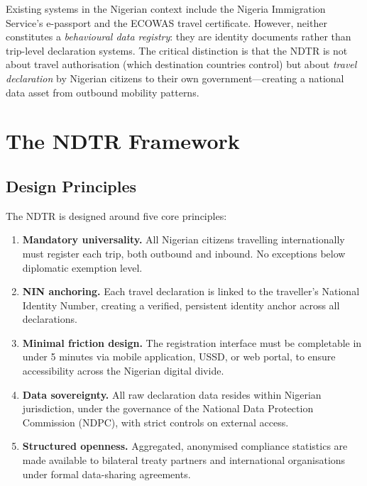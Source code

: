 \documentclass[11pt]{article}
\begin{document}
Existing systems in the Nigerian context include the Nigeria Immigration
Service's e-passport and the ECOWAS travel certificate. However, neither
constitutes a \textit{behavioural data registry}: they are identity
documents rather than trip-level declaration systems. The critical
distinction is that the NDTR is not about travel authorisation
(which destination countries control) but about \textit{travel declaration}
by Nigerian citizens to their own government---creating a national data
asset from outbound mobility patterns.

\section{The NDTR Framework}
\label{sec:framework}

\subsection{Design Principles}

The NDTR is designed around five core principles:

\begin{enumerate}[label=\textbf{P\arabic*.}, leftmargin=*]
  \item \textbf{Mandatory universality.} All Nigerian citizens travelling
  internationally must register each trip, both outbound and inbound.
  No exceptions below diplomatic exemption level.

  \item \textbf{NIN anchoring.} Each travel declaration is linked to the
  traveller's National Identity Number, creating a verified, persistent
  identity anchor across all declarations.

  \item \textbf{Minimal friction design.} The registration interface must
  be completable in under 5 minutes via mobile application, USSD, or
  web portal, to ensure accessibility across the Nigerian digital divide.

  \item \textbf{Data sovereignty.} All raw declaration data resides within
  Nigerian jurisdiction, under the governance of the National Data
  Protection Commission (NDPC), with strict controls on external access.

  \item \textbf{Structured openness.} Aggregated, anonymised compliance
  statistics are made available to bilateral treaty partners and
  international organisations under formal data-sharing agreements.
\end{enumerate}
\end{document}
